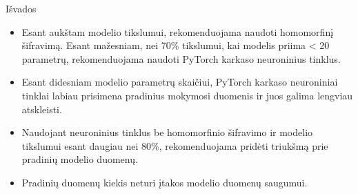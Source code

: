 \begin{frame}[c]{Išvados}
 
\begin{itemize}
    \item Esant aukštam modelio tikslumui, rekomenduojama naudoti homomorfinį šifravimą. Esant mažesniam, nei 70\% tikslumui, kai modelis priima < 20 parametrų, rekomenduojama naudoti PyTorch karkaso neuroninius tinklus.
    \item Esant didesniam modelio parametrų skaičiui, PyTorch karkaso neuroniniai tinklai labiau prisimena pradinius mokymosi duomenis ir juos galima lengviau atskleisti.
    \item Naudojant neuroninius tinklus be homomorfinio šifravimo ir modelio tikslumui esant daugiau nei 80\%, rekomenduojama pridėti triukšmą prie pradinių modelio duomenų.
    \item Pradinių duomenų kiekis neturi įtakos modelio duomenų saugumui.
\end{itemize}

\end{frame}